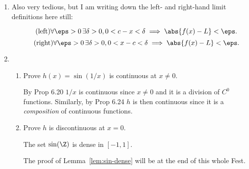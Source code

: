 \documentclass{article}
\begin{document}
\begin{enumerate}
        \begin{proof}
          Suppose there is some $\alpha \notin \Q$ such that $f(\alpha) \ne 0$. Fix $\eps = \abs{f(\alpha)}$.
          For each $\delta > 0$ we see that
          \[ \abs{x - \alpha} < \delta \implies \abs{f(x) - f(\alpha)}. \]
          However, similar to before, we may pick some rational $x$ within $N_{\delta}(\alpha)$, and so find
          that
          \[ \abs{x - \alpha} < \delta \quad\text{and}\quad \abs{f(x) - f(\alpha)} = \abs{f(\alpha)} \not< \eps. \]
        \end{proof}
  \item Also very tedious, but I am writing down the left- and right-hand limit definitions here still:

        \[\tag{left} \forall \eps > 0 \, \exists \delta > 0, 0 < c - x < \delta \implies \abs{f(x) - L} < \eps. \]
        \[\tag{right} \forall \eps > 0 \, \exists \delta > 0, 0 < x - c < \delta \implies \abs{f(x) - L} < \eps. \]



  \item
        \begin{enumerate}

          \item Prove $h(x) = \sin(1/x)$ is continuous at $x \ne 0$.

                By Prop 6.20 $1/x$ is continuous since $x \ne 0$ and it is a division of $C^{0}$ functions.
                Similarly, by Prop 6.24 $h$ is then continuous since it is a \emph{composition} of continuous functions.

          \item Prove $h$ is discontinuous at $x = 0$.

                \begin{lem}\label{lem:sin-dense}
                  The set $\sin(\Z)$ is dense in $[-1, 1]$.
                \end{lem}

                The proof of Lemma~\ref{lem:sin-dense} will be at the end of this whole Fest.


\end{enumerate}
\end{enumerate}
\end{document}
